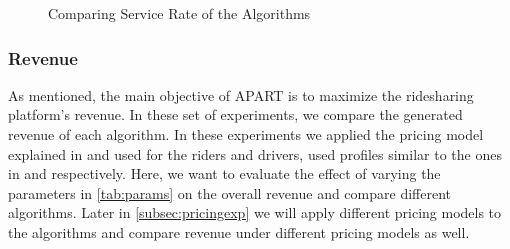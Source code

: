 \begin{figure}[h]
    \centering
    \vspace{-0.15in}
    \caption{Comparing Service Rate of the Algorithms}
    \label{fig:sr}
\end{figure}

\subsubsection{Revenue}
As mentioned, the main objective of APART is to maximize the ridesharing platform's revenue. In these set of experiments, we compare the generated revenue of each algorithm. In these experiments we applied the pricing model explained in  and used for the riders and drivers, used profiles similar to the ones in  and  respectively. Here, we want to evaluate the effect of varying the parameters in \cref{tab:params} on the overall revenue and compare different algorithms. Later in \cref{subsec:pricingexp} we will apply different pricing models to the algorithms and compare revenue under different pricing models as well.

